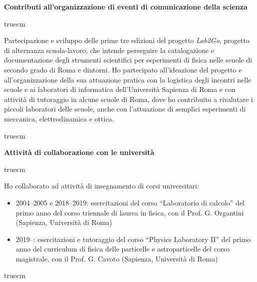 \documentclass[11pt,twoside,a4paper]{article}
\begin{document}
\begin{center}
\textbf{Contributi all’organizzazione di eventi di comunicazione della scienza}
\end{center}
 truecm

Partecipazione e sviluppo delle prime tre edizioni del progetto
\textit{Lab2Go}, progetto di alternanza scuola-lavoro, che intende
perseguire la catalogazione e documentazione degli strumenti
scientifici per esperimenti di fisica nelle scuole di secondo grado di
Roma e dintorni. Ho partecipato all'ideazione del progetto e
all'organizzazione della sua attuazione pratica con la logistica degli
incontri nelle scuole e ai laboratori di informatica dell'Universit\`a
Sapienza di Roma e con attivit\`a di tutoraggio in alcune scuole di
Roma, dove ho contribuito a rivalutare i piccoli laboratori delle
scuole, anche con l'attuazione di semplici esperimenti di meccanica,
elettrodinamica e ottica.

 truecm
\begin{center}
\textbf{Attivit\`a di collaborazione con le universit\`a}
\end{center}
 truecm

Ho collaborato ad attivit\`a di insegnamento di corsi universitari:
\begin{itemize}
\item 2004--2005 e 2018--2019: esercitazioni del corso ``Laboratorio
  di calcolo'' del primo anno del corso triennale di laurea in fisica,
  con il Prof. G. Organtini (Sapienza, Universit\`a di Roma)
\item 2019--: esercitazioni e tutoraggio del corso ``Physics
  Laboratory II'' del primo anno del curriculum di fisica delle
  particelle e astroparticelle del corso magistrale, con il
  Prof. G. Cavoto (Sapienza, Universit\`a di Roma)
\end{itemize}
 truecm
\end{document}
